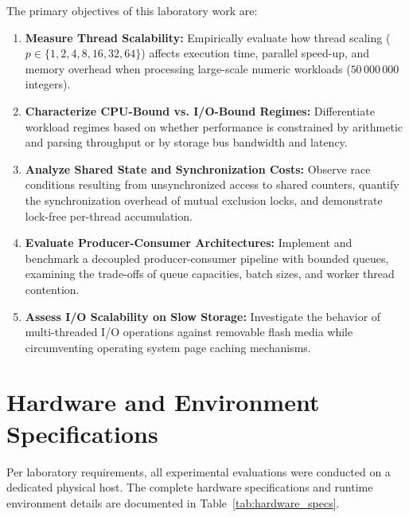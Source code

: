 \documentclass[12pt,a4paper]{article}
\begin{document}
The primary objectives of this laboratory work are:
\begin{enumerate}
    \item \textbf{Measure Thread Scalability:} Empirically evaluate how thread scaling ($p \in \{1, 2, 4, 8, 16, 32, 64\}$) affects execution time, parallel speed-up, and memory overhead when processing large-scale numeric workloads ($50\,000\,000$ integers).
    \item \textbf{Characterize CPU-Bound vs. I/O-Bound Regimes:} Differentiate workload regimes based on whether performance is constrained by arithmetic and parsing throughput or by storage bus bandwidth and latency.
    \item \textbf{Analyze Shared State and Synchronization Costs:} Observe race conditions resulting from unsynchronized access to shared counters, quantify the synchronization overhead of mutual exclusion locks, and demonstrate lock-free per-thread accumulation.
    \item \textbf{Evaluate Producer-Consumer Architectures:} Implement and benchmark a decoupled producer-consumer pipeline with bounded queues, examining the trade-offs of queue capacities, batch sizes, and worker thread contention.
    \item \textbf{Assess I/O Scalability on Slow Storage:} Investigate the behavior of multi-threaded I/O operations against removable flash media while circumventing operating system page caching mechanisms.
\end{enumerate}

\section{Hardware and Environment Specifications}

Per laboratory requirements, all experimental evaluations were conducted on a dedicated physical host. The complete hardware specifications and runtime environment details are documented in Table~\ref{tab:hardware_specs}.
\end{document}
